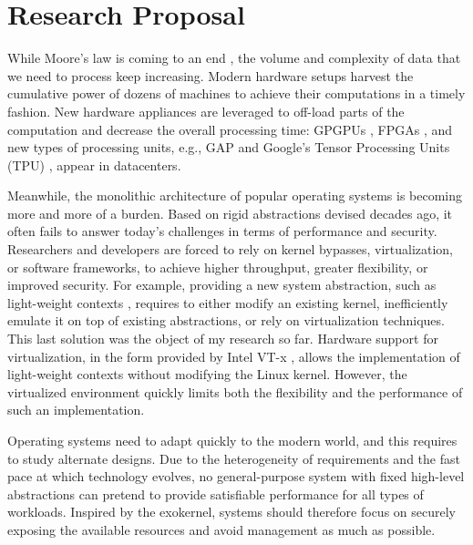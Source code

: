 \section{Research Proposal}

While Moore's law is coming to an end \cite{DBLP:journals/cse/TheisW17,DBLP:journals/computer/DeBenedictis17}, the volume and complexity of data that we need to process keep increasing.
Modern hardware setups harvest the cumulative power of dozens of machines to achieve their computations in a timely fashion.
New hardware appliances are leveraged to off-load parts of the computation and decrease the overall processing time: GPGPUs \cite{DBLP:journals/pvldb/YuanL013,DBLP:conf/damon/KaldeweyLMV12,DBLP:journals/pvldb/Ailamaki15}, FPGAs \cite{DBLP:journals/cacm/PutnamCCCCDEFGG16}, and new types of processing units, e.g., GAP \cite{DARPAGAP} and Google's Tensor Processing Units (TPU) \cite{GoogleTPU}, appear in datacenters.

Meanwhile, the monolithic architecture of popular operating systems is becoming more and more of a burden.
Based on rigid abstractions devised decades ago, it often fails to answer today's challenges in terms of performance and security.
Researchers and developers are forced to rely on kernel bypasses, virtualization, or software frameworks, to achieve higher throughput, greater flexibility, or improved security.
For example, providing a new system abstraction, such as light-weight contexts \cite{DBLP:conf/osdi/LittonVE0BD16}, requires to either modify an existing kernel, inefficiently emulate it on top of existing abstractions, or rely on virtualization techniques.
This last solution was the object of my research so far.
Hardware support for virtualization, in the form provided by Intel VT-x \cite{DBLP:journals/computer/UhligNRSMABKLS05}, allows the implementation of light-weight contexts without modifying the Linux kernel.
However, the virtualized environment quickly limits both the flexibility and the performance of such an implementation.

Operating systems need to adapt quickly to the modern world, and this requires to study alternate designs.
Due to the heterogeneity of requirements and the fast pace at which technology evolves, no general-purpose  system with fixed high-level abstractions can pretend to provide satisfiable performance for all types of workloads.
Inspired by the exokernel, systems should therefore focus on securely exposing the available resources and avoid management as much as possible.

